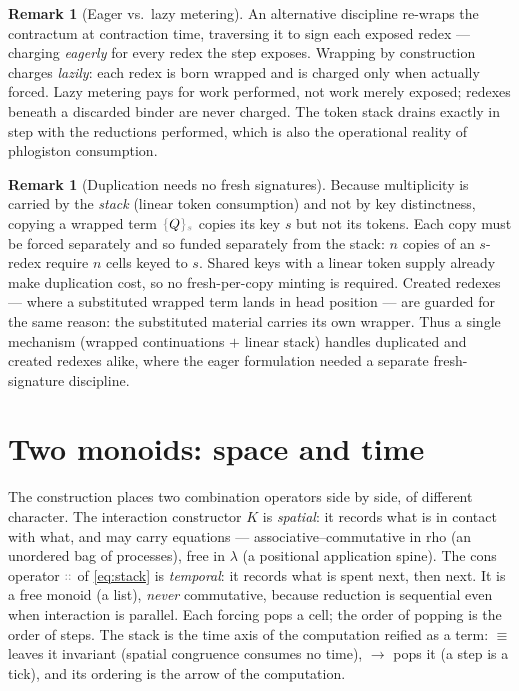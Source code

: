 \documentclass[11pt]{article}
\theoremstyle{definition}
\newtheorem{remark}[definition]{Remark}
\theoremstyle{plain}
\newcommand{\dec}[1]{\textcolor{costgray}{#1}}   %
\newcommand{\sgn}[2]{\dec{\{}{#1}\dec{\}_{#2}}}  %
\newcommand{\cons}{\mathbin{\dec{\dblcolon}}}  %
\newcommand{\red}{\longrightarrow}
\newcommand{\Seq}{\equiv}
\begin{document}
\begin{remark}[Eager vs.\ lazy metering]
\label{rem:lazy}
An alternative discipline re-wraps the contractum at contraction time,
traversing it to sign each exposed redex --- charging \emph{eagerly} for
every redex the step exposes. Wrapping by construction charges
\emph{lazily}: each redex is born wrapped and is charged only when
actually forced. Lazy metering pays for work performed, not work merely
exposed; redexes beneath a discarded binder are never charged. The token
stack drains exactly in step with the reductions performed, which is also
the operational reality of phlogiston consumption.
\end{remark}

\begin{remark}[Duplication needs no fresh signatures]
\label{rem:dup}
Because multiplicity is carried by the \emph{stack} (linear token
consumption) and not by key distinctness, copying a wrapped term
$\sgn{Q}{s}$ copies its key $s$ but not its tokens. Each copy must be
forced separately and so funded separately from the stack: $n$ copies of
an $s$-redex require $n$ cells keyed to $s$. Shared keys with a linear
token supply already make duplication cost, so no fresh-per-copy minting
is required. Created redexes --- where a substituted wrapped term lands in
head position --- are guarded for the same reason: the substituted
material carries its own wrapper. Thus a single mechanism (wrapped
continuations $+$ linear stack) handles duplicated and created redexes
alike, where the eager formulation needed a separate fresh-signature
discipline.
\end{remark}

\section{Two monoids: space and time}
\label{sec:two-monoids}

The construction places two combination operators side by side, of
different character. The interaction constructor $K$ is \emph{spatial}:
it records what is in contact with what, and may carry equations ---
associative--commutative in rho (an unordered bag of processes), free in
$\lambda$ (a positional application spine). The cons operator $\cons$ of
\eqref{eq:stack} is \emph{temporal}: it records what is spent next, then
next. It is a free monoid (a list), \emph{never} commutative, because
reduction is sequential even when interaction is parallel. Each forcing
pops a cell; the order of popping is the order of steps. The stack is the
time axis of the computation reified as a term: $\Seq$ leaves it
invariant (spatial congruence consumes no time), $\red$ pops it (a step
is a tick), and its ordering is the arrow of the computation.
\end{document}
